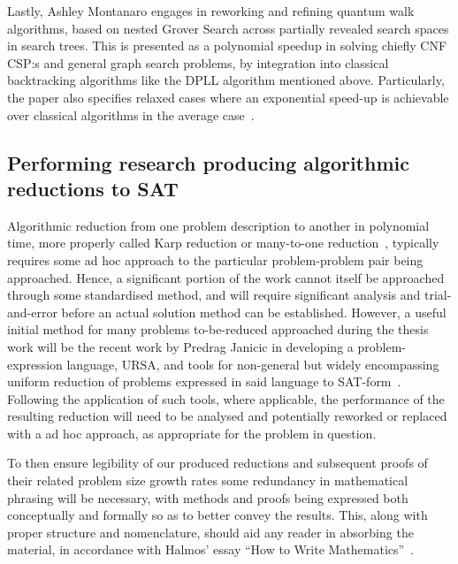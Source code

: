 \documentclass[msc,lith,english]{liuthesis}
\begin{document}

Lastly, Ashley Montanaro engages in reworking and refining quantum walk algorithms, based on nested Grover Search across partially revealed search spaces in search trees. This is presented as a polynomial speedup in solving chiefly CNF CSP:s and general graph search problems, by integration into classical backtracking algorithms like the DPLL algorithm mentioned above. Particularly, the paper also specifies relaxed cases where an exponential speed-up is achievable over classical algorithms in the average case~\cite{QWSBA}.

\subsection{Performing research producing algorithmic reductions to SAT}

Algorithmic reduction from one problem description to another in polynomial time, more properly called Karp reduction or many-to-one reduction~\cite{CCAMA}, typically requires some ad hoc approach to the particular problem-problem pair being approached. Hence, a significant portion of the work cannot itself be approached through some standardised method, and will require significant analysis and trial-and-error before an actual solution method can be established. However, a useful initial method for many problems to-be-reduced approached during the thesis work will be the recent work by Predrag Janicic in developing a problem-expression language, URSA, and tools for non-general but widely encompassing uniform reduction of problems expressed in said language to SAT-form~\cite{URSA}. Following the application of such tools, where applicable, the performance of the resulting reduction will need to be analysed and potentially reworked or replaced with a ad hoc approach, as appropriate for the problem in question. 

To then ensure legibility of our produced reductions and subsequent proofs of their related problem size growth rates some redundancy in mathematical phrasing will be necessary, with methods and proofs being expressed both conceptually and formally so as to better convey the results. This, along with proper structure and nomenclature, should aid any reader in absorbing the material, in accordance with Halmos' essay ``How to Write Mathematics''~\cite{HTWM}.
\end{document}
